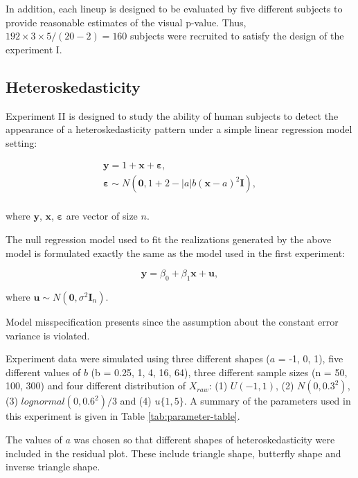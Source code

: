 \documentclass[]{interact}
\theoremstyle{plain}%
\theoremstyle{definition}
\theoremstyle{remark}
\begin{document}
In addition, each lineup is designed to be evaluated by five different
subjects to provide reasonable estimates of the visual p-value. Thus,
\(192 \times 3 \times 5 / (20 - 2) = 160\) subjects were recruited to
satisfy the design of the experiment I.

\hypertarget{heteroskedasticity-1}{%
\subsection{Heteroskedasticity}\label{heteroskedasticity-1}}

Experiment II is designed to study the ability of human subjects to
detect the appearance of a heteroskedasticity pattern under a simple
linear regression model setting:

\begin{align} \label{eq:heter-model}
\boldsymbol{y} = 1 + \boldsymbol{x} + \boldsymbol{\varepsilon},\\
\boldsymbol{\varepsilon} \sim N(\boldsymbol{0}, 1 + 2 - |a| b (\boldsymbol{x} - a)^2 \boldsymbol{I}), \\
\end{align}

where \(\boldsymbol{y}\), \(\boldsymbol{x}\),
\(\boldsymbol{\varepsilon}\) are vector of size \(n\).

The null regression model used to fit the realizations generated by the
above model is formulated exactly the same as the model used in the
first experiment:

\begin{equation} 
\boldsymbol{y} = \beta_0 + \beta_1 \boldsymbol{x} + \boldsymbol{u},
\end{equation}

where
\(\boldsymbol{u} \sim N(\boldsymbol{0}, \sigma^2\boldsymbol{I}_n)\).

Model misspecification presents since the assumption about the constant
error variance is violated.

Experiment data were simulated using three different shapes (\(a\) = -1,
0, 1), five different values of \(b\) (b = 0.25, 1, 4, 16, 64), three
different sample sizes (n = 50, 100, 300) and four different
distribution of \(X_{raw}\): (1) \(U(-1, 1)\), (2) \(N(0, 0.3^2)\), (3)
\(lognormal(0, 0.6^2)/3\) and (4) \(u\{1, 5\}\). A summary of the
parameters used in this experiment is given in Table
\ref{tab:parameter-table}.

The values of \(a\) was chosen so that different shapes of
heteroskedasticity were included in the residual plot. These include
triangle shape, butterfly shape and inverse triangle shape.
\end{document}
